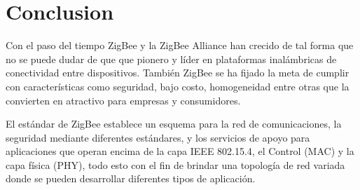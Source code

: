 \documentclass[10pt,journal,compsoc]{IEEEtran}
\begin{document}




\section{Conclusion}
Con el paso del tiempo ZigBee y la ZigBee Alliance han crecido de tal forma que no se puede dudar de que que pionero y líder en plataformas inalámbricas de conectividad entre dispositivos. También ZigBee se ha fijado la meta de cumplir con características como seguridad, bajo costo, homogeneidad entre otras que la convierten en atractivo para empresas y consumidores. 

El estándar de ZigBee establece un esquema para la red de comunicaciones, la seguridad mediante diferentes estándares, y los servicios de apoyo para aplicaciones que operan encima de la capa IEEE 802.15.4, el Control (MAC) y la capa física (PHY), todo esto con el fin de brindar una topología de red variada donde se pueden desarrollar diferentes tipos de aplicación. 



%
\end{document}
